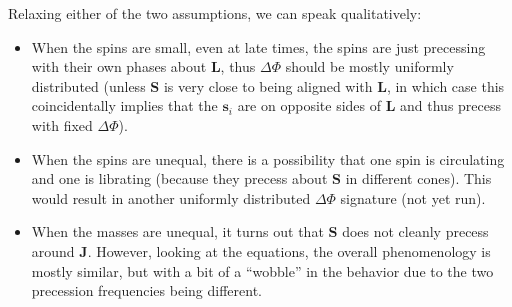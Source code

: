 \documentclass[11pt,
        usenames, %
        dvipsnames %
    ]{article}
\newcommand*{\bm}[1]{\boldsymbol{\mathbf{#1}}}
\begin{document}
Relaxing either of the two assumptions, we can speak qualitatively:
\begin{itemize}
    \item When the spins are small, even at late times, the spins are just
        precessing with their own phases about $\bm{L}$, thus $\Delta \Phi$
        should be mostly uniformly distributed (unless $\bm{S}$ is very close to
        being aligned with $\bm{L}$, in which case this coincidentally implies
        that the $\bm{s}_i$ are on opposite sides of $\bm{L}$ and thus precess
        with fixed $\Delta \Phi$).

    \item When the spins are unequal, there is a possibility that one spin is
        circulating and one is librating (because they precess about $\bm{S}$ in
        different cones). This would result in another uniformly distributed
        $\Delta \Phi$ signature (not yet run).

    \item When the masses are unequal, it turns out that $\bm{S}$ does not
        cleanly precess around $\bm{J}$. However, looking at the equations, the
        overall phenomenology is mostly similar, but with a bit of a ``wobble''
        in the behavior due to the two precession frequencies being different.
\end{itemize}
\end{document}

